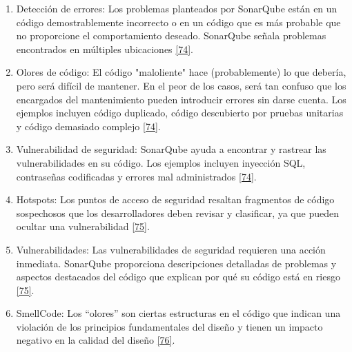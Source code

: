 \begin{enumerate}
	\item Detección de errores: Los problemas planteados por SonarQube están en un código demostrablemente incorrecto o en un código que es más probable que no proporcione el comportamiento deseado. SonarQube  señala problemas encontrados en múltiples ubicaciones \hyperlink{b74}{[74]}.
	\item Olores de código: El código "maloliente" hace (probablemente) lo que debería, pero será difícil de mantener. En el peor de los casos, será tan confuso que los encargados del mantenimiento pueden introducir errores sin darse cuenta. Los ejemplos incluyen código duplicado, código descubierto por pruebas unitarias y código demasiado complejo \hyperlink{b74}{[74]}.
	\item Vulnerabilidad de seguridad: SonarQube ayuda a encontrar y rastrear las vulnerabilidades en su código. Los ejemplos incluyen inyección SQL, contraseñas codificadas y errores mal administrados \hyperlink{b74}{[74]}.
	\item Hotspots: Los puntos de acceso de seguridad resaltan fragmentos de código sospechosos que los desarrolladores deben revisar y clasificar, ya que pueden ocultar una vulnerabilidad \hyperlink{b75}{[75]}.
	\item Vulnerabilidades: Las vulnerabilidades de seguridad requieren una acción inmediata. SonarQube proporciona descripciones detalladas de problemas y aspectos destacados del código que explican por qué su código está en riesgo \hyperlink{b75}{[75]}.
	\item SmellCode: 
	Los “olores” son ciertas estructuras en el código que indican una violación de los principios fundamentales del diseño y tienen un impacto negativo en la calidad del diseño \hyperlink{b76}{[76]}.
\end{enumerate}














